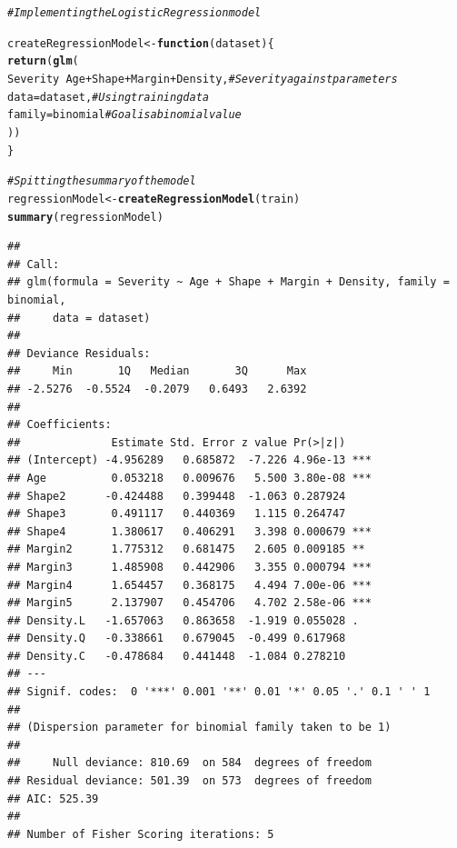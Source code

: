 \documentclass[a4paper,12pt]{article}\usepackage[]{graphicx}\usepackage[]{color}
\makeatletter
\newcommand{\hlcom}[1]{\textcolor[rgb]{0.678,0.584,0.686}{\textit{#1}}}%
\newcommand{\hlopt}[1]{\textcolor[rgb]{0,0,0}{#1}}%
\newcommand{\hlstd}[1]{\textcolor[rgb]{0.345,0.345,0.345}{#1}}%
\newcommand{\hlkwa}[1]{\textcolor[rgb]{0.161,0.373,0.58}{\textbf{#1}}}%
\newcommand{\hlkwb}[1]{\textcolor[rgb]{0.69,0.353,0.396}{#1}}%
\newcommand{\hlkwc}[1]{\textcolor[rgb]{0.333,0.667,0.333}{#1}}%
\newcommand{\hlkwd}[1]{\textcolor[rgb]{0.737,0.353,0.396}{\textbf{#1}}}%
\newenvironment{kframe}{%
 \def\at@end@of@kframe{}%
 \ifinner\ifhmode%
  \def\at@end@of@kframe{\end{minipage}}%
  \begin{minipage}{\columnwidth}%
 \fi\fi%
 \def\FrameCommand##1{\hskip\@totalleftmargin \hskip-\fboxsep
 \colorbox{shadecolor}{##1}\hskip-\fboxsep
     \hskip-\linewidth \hskip-\@totalleftmargin \hskip\columnwidth}%
 \MakeFramed {\advance\hsize-\width
   \@totalleftmargin\z@ \linewidth\hsize
   \@setminipage}}%
 {\par\unskip\endMakeFramed%
 \at@end@of@kframe}
\newenvironment{knitrout}{}{} %
\makeatother
\begin{document}
\begin{knitrout}
\color{fgcolor}\begin{kframe}
\begin{alltt}
\hlcom{# Implementing the Logistic Regression model}

\hlstd{createRegressionModel} \hlkwb{<-} \hlkwa{function} \hlstd{(}\hlkwc{dataset}\hlstd{) \{}
  \hlkwd{return}\hlstd{(} \hlkwd{glm}\hlstd{(}
    \hlstd{Severity} \hlopt{~} \hlstd{Age}\hlopt{+}\hlstd{Shape}\hlopt{+}\hlstd{Margin}\hlopt{+}\hlstd{Density,} \hlcom{# Severity against parameters}
    \hlkwc{data}\hlstd{=dataset,}                        \hlcom{# Using training data}
    \hlkwc{family}\hlstd{=binomial}                      \hlcom{# Goal is a binomial value}
  \hlstd{))}
\hlstd{\}}

\hlcom{# Spitting the summary of the model}
\hlstd{regressionModel} \hlkwb{<-} \hlkwd{createRegressionModel}\hlstd{(train)}
\hlkwd{summary}\hlstd{(regressionModel)}
\end{alltt}
\begin{verbatim}
## 
## Call:
## glm(formula = Severity ~ Age + Shape + Margin + Density, family = binomial, 
##     data = dataset)
## 
## Deviance Residuals: 
##     Min       1Q   Median       3Q      Max  
## -2.5276  -0.5524  -0.2079   0.6493   2.6392  
## 
## Coefficients:
##              Estimate Std. Error z value Pr(>|z|)    
## (Intercept) -4.956289   0.685872  -7.226 4.96e-13 ***
## Age          0.053218   0.009676   5.500 3.80e-08 ***
## Shape2      -0.424488   0.399448  -1.063 0.287924    
## Shape3       0.491117   0.440369   1.115 0.264747    
## Shape4       1.380617   0.406291   3.398 0.000679 ***
## Margin2      1.775312   0.681475   2.605 0.009185 ** 
## Margin3      1.485908   0.442906   3.355 0.000794 ***
## Margin4      1.654457   0.368175   4.494 7.00e-06 ***
## Margin5      2.137907   0.454706   4.702 2.58e-06 ***
## Density.L   -1.657063   0.863658  -1.919 0.055028 .  
## Density.Q   -0.338661   0.679045  -0.499 0.617968    
## Density.C   -0.478684   0.441448  -1.084 0.278210    
## ---
## Signif. codes:  0 '***' 0.001 '**' 0.01 '*' 0.05 '.' 0.1 ' ' 1
## 
## (Dispersion parameter for binomial family taken to be 1)
## 
##     Null deviance: 810.69  on 584  degrees of freedom
## Residual deviance: 501.39  on 573  degrees of freedom
## AIC: 525.39
## 
## Number of Fisher Scoring iterations: 5
\end{verbatim}
\end{kframe}
\end{knitrout}
\end{document}
